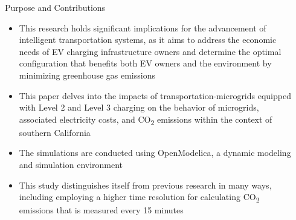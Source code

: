\documentclass[final, 20 pt]{beamer}
\newlength{\sepwid}
\newlength{\onecolwid}
\begin{document}
\begin{frame}[t] %

\begin{columns}[t] %

\begin{column}{\sepwid}\end{column} %

\begin{column}{\onecolwid} %


\begin{alertblock}{Purpose and Contributions}
	\begin{itemize}
		\item This research holds significant implications for the advancement of intelligent transportation systems, as it aims to address the economic needs of EV charging infrastructure owners and determine the optimal configuration that benefits both EV owners and the environment by minimizing greenhouse gas emissions
		\item This paper delves into the impacts of transportation-microgrids equipped with Level 2 and Level 3 charging on the behavior of microgrids, associated electricity costs, and CO\textsubscript{2} emissions within the context of southern California
		\item The simulations are conducted using OpenModelica, a dynamic modeling and simulation environment
		\item This study distinguishes itself from previous research in many ways, including employing a higher time resolution for calculating CO\textsubscript{2} emissions that is measured every 15 minutes
	\end{itemize}
\end{alertblock}



\end{column}
\end{columns}
\end{frame}
\end{document}
